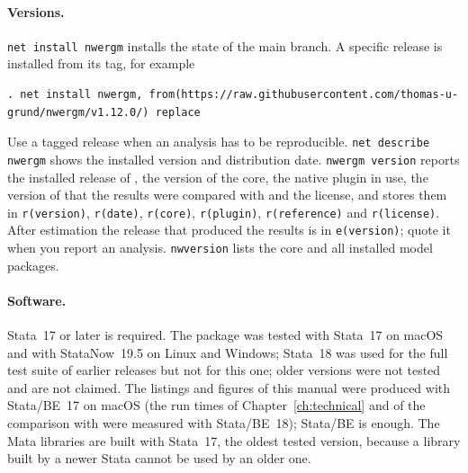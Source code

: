 \paragraph{Versions.} \texttt{net install nwergm} installs the state of the main branch. A specific release is installed from its tag, for example
\begin{lstlisting}
. net install nwergm, from(https://raw.githubusercontent.com/thomas-u-grund/nwergm/v1.12.0/) replace
\end{lstlisting}
Use a tagged release when an analysis has to be reproducible. \texttt{net describe nwergm} shows the installed version and distribution date. \texttt{nwergm version} reports the installed release of \nwergm{}, the version of the core, the native plugin in use, the version of \ergm{} that the results were compared with and the license, and stores them in \texttt{r(version)}, \texttt{r(date)}, \texttt{r(core)}, \texttt{r(plugin)}, \texttt{r(reference)} and \texttt{r(license)}. After estimation the release that produced the results is in \texttt{e(version)}; quote it when you report an analysis. \texttt{nwversion} lists the core and all installed model packages.

\paragraph{Software.} Stata~17 or later is required. The package was tested with Stata~17 on macOS and with StataNow~19.5 on Linux and Windows; Stata~18 was used for the full test suite of earlier releases but not for this one; older versions were not tested and are not claimed. The listings and figures of this manual were produced with Stata/BE~17 on macOS (the run times of Chapter~\ref{ch:technical} and of the comparison with \ergm{} were measured with Stata/BE~18); Stata/BE is enough. The Mata libraries are built with Stata~17, the oldest tested version, because a library built by a newer Stata cannot be used by an older one.

